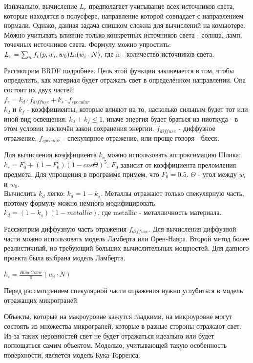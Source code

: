 \documentclass[a4paper,14pt]{extarticle}
\begin{document}
Изначально, вычисление $L_r$ предполагает учитывание всех источников света, которые находятся в полусфере, 
направление которой совпадает с направлением нормали. Однако, данная задача слишком сложна для вычислений на комьютере. 
Можно учитывать влияние только конкретных источников света - солнца, ламп, точечных источников света. Формулу можно упростить:\\
$L_r = \sum_{n}^{} f_r(p, w_i, w_0) \space L_i \space (w_i \cdot N)$, где n - количество источников света.

Рассмотрим BRDF подробнее. Цель этой функции заключается в том, чтобы определить, как материал будет отражать свет в определённом направлении.
Она состоит их двух частей:\\
$f_r = k_d \cdot f_{diffuse} + k_s \cdot f_{specular}$\\
$k_d$ и $k_f$ - коэффициенты, которые влияют на то, насколько сильным будет тот или иной вид освещения. 
$k_d + k_f \leq 1$, иначе энергия будет браться из ниоткуда - в этом условии заключён закон сохранения энергии.
$f_{diffuse}$ - диффузное отражение, $f_{specular}$ - спекулярное отражение, или проще говоря - блеск.

Для вычисления коэффициента $k_s$ можно использовать аппроксимацию Шлика:\\
$k_s = F_0 + (1 - F_0)(1 - cos \Theta)^5$. $F_0$ зависит от коэффициента преломления предмета. 
Для упрощения в программе примем, что $F_0 = 0.5$.
$\Theta$ - угол между $w_i$ и $w_0$.\\
Вычислить $k_d$ легко: $k_d = 1 - k_s$. Металлы отражают только спекулярную часть, поэтому формулу можно немного модифицировать:\\
$k_d = (1 - k_s) (1 - metallic)$, где metallic - металличность материала.

Рассмотрим диффузную часть отражения $f_{diffuse}$. Для вычисления диффузной части можно использовать модель Ламберта или Орен-Наяра. 
Второй метод более реалистичный, но требующий больших вычислительных мощностей. Для данного проекта была выбрана модель Ламберта.

$k_s = \frac{BaseColor}{\pi} (w_i \cdot N)$

Перед рассмотрением спекулярной части отражения нужно углубиться в модель отражащих микрограней.

Объекты, которые на макроуровне кажутся гладкими, на микроуровне могут состоять из множества микрограней, 
которые в разные стороны отражают свет. Из-за таких неровностей свет не будет отражаться идеально или будет поглощаться самим объектом.
Моделью, учитывающей такую особенность поверхности, является модель Кука-Торренса:\\
\end{document}
